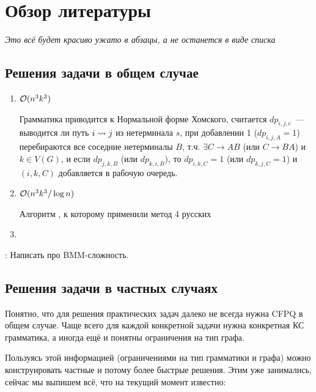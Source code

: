 \section{Обзор литературы}

\textit{Это всё будет красиво ужато в абзацы, а не останется в виде списка}

\subsection{Решения задачи в общем случае}

\begin{enumerate}
    \item $\mathcal{O}(n^3 k^3)$ \cite{Reps97}

    Грамматика приводится к Нормальной форме Хомского, считается $dp_{i,j,c}$~--- выводится ли путь $i \rightsquigarrow j$ из нетерминала $s$, при добавлении 1 ($dp_{i,j,A} = 1$) перебираются все соседние нетерминалы $B$, т.ч. $\exists C \to AB$ (или $C \to BA$) и $k \in V(G)$, и если $dp_{j, k, B}$ (или $dp_{k, i, B}$), то $dp_{i, k, C} = 1$ (или $dp_{k, j, C} = 1$) и $(i, k, C)$ добавляется в рабочую очередь.

    \item $\mathcal{O}(n^3 k^3 / \log n)$ \cite{Chaudhuri08}

    Алгоритм \cite{Reps97}, к которому применили метод 4 русских

    \item 

\end{enumerate}

\TODO: Написать про BMM-сложность.

\subsection{Решения задачи в частных случаях}

Понятно, что для решения практических задач далеко не всегда нужна CFPQ в общем случае. Чаще всего для каждой конкретной задачи нужна конкретная КС грамматика, а иногда ещё и понятны ограничения на тип графа.

Пользуясь этой информацией (ограничениями на тип грамматики и графа) можно конструировать частные и потому более быстрые решения. Этим уже занимались, сейчас мы выпишем всё, что на текущий момент известно:

